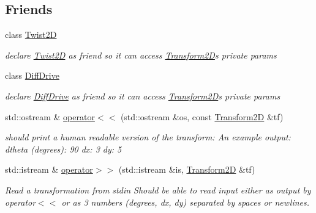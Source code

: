 \subsection*{Friends}
\begin{DoxyCompactItemize}
\item 
\mbox{\label{classrigid2d_1_1Transform2D_addec8146e4e13196f026a35c51c03c55}} 
class \hyperlink{classrigid2d_1_1Transform2D_addec8146e4e13196f026a35c51c03c55}{Twist2D}
\begin{DoxyCompactList}\small\item\em declare \hyperlink{classrigid2d_1_1Twist2D}{Twist2D} as friend so it can access \hyperlink{classrigid2d_1_1Transform2D}{Transform2D}\textquotesingle{}s private params \end{DoxyCompactList}\item 
\mbox{\label{classrigid2d_1_1Transform2D_a43d7c8fc235f7592079bde4168cd48d8}} 
class \hyperlink{classrigid2d_1_1Transform2D_a43d7c8fc235f7592079bde4168cd48d8}{Diff\+Drive}
\begin{DoxyCompactList}\small\item\em declare \hyperlink{classrigid2d_1_1DiffDrive}{Diff\+Drive} as friend so it can access \hyperlink{classrigid2d_1_1Transform2D}{Transform2D}\textquotesingle{}s private params \end{DoxyCompactList}\item 
std\+::ostream \& \hyperlink{classrigid2d_1_1Transform2D_ad5239a3fa3a0f9cebd73c39f34c2075f}{operator$<$$<$} (std\+::ostream \&os, const \hyperlink{classrigid2d_1_1Transform2D}{Transform2D} \&tf)
\begin{DoxyCompactList}\small\item\em should print a human readable version of the transform\+: An example output\+: dtheta (degrees)\+: 90 dx\+: 3 dy\+: 5 \end{DoxyCompactList}\item 
std\+::istream \& \hyperlink{classrigid2d_1_1Transform2D_a7184f9b63deb3b10878054c34b02682b}{operator$>$$>$} (std\+::istream \&is, \hyperlink{classrigid2d_1_1Transform2D}{Transform2D} \&tf)
\begin{DoxyCompactList}\small\item\em Read a transformation from stdin Should be able to read input either as output by operator$<$$<$ or as 3 numbers (degrees, dx, dy) separated by spaces or newlines. \end{DoxyCompactList}\end{DoxyCompactItemize}


